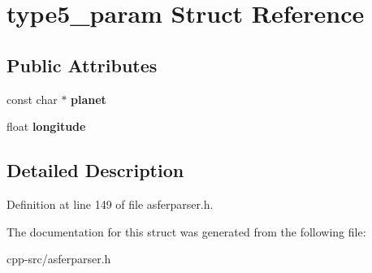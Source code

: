 \hypertarget{structtype5__param}{\section{type5\-\_\-param Struct Reference}
\label{structtype5__param}
}
\subsection*{Public Attributes}
\begin{DoxyCompactItemize}
\item 
\hypertarget{structtype5__param_aa794b48c2a8e8ec5521277863526cd3e}{const char $\ast$ {\bfseries planet}}\label{structtype5__param_aa794b48c2a8e8ec5521277863526cd3e}

\item 
\hypertarget{structtype5__param_a53e6063e10e476d7a1bb14bc1075a205}{float {\bfseries longitude}}\label{structtype5__param_a53e6063e10e476d7a1bb14bc1075a205}

\end{DoxyCompactItemize}


\subsection{Detailed Description}


Definition at line 149 of file asferparser.\-h.



The documentation for this struct was generated from the following file\-:\begin{DoxyCompactItemize}
\item 
cpp-\/src/asferparser.\-h\end{DoxyCompactItemize}
